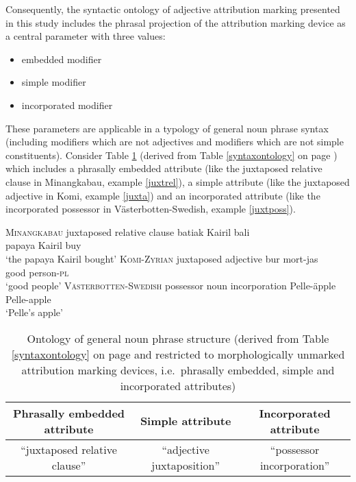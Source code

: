 Consequently, the syntactic ontology of adjective attribution marking presented in this study includes the phrasal projection of the attribution marking device as a central parameter with three values:
\begin{itemize}
\item embedded modifier
\item simple modifier
\item incorporated modifier
\end{itemize}
These parameters are applicable in a typology of general noun phrase syntax (including modifiers which are not adjectives and modifiers which are not simple constituents). Consider Table  \ref{ontologyderived} (derived from Table \ref{syntaxontology} on page \pageref{syntaxontology}) which includes a phrasally embedded attribute (like the juxtaposed relative clause in Minangkabau, example \ref{juxtrel}), a simple attribute (like the juxtaposed adjective in Komi, example \ref{juxta}) and an incorporated attribute (like the incorporated possessor in Västerbotten-Swedish, example \ref{juxtposs}).
\begin{exe}
\ex
\begin{xlist}
\ex \textsc{Minangkabau} juxtaposed relative clause \citep[3–4]{gil2005} \label{juxtrel}
\gll batiak Kairil bali\\
	papaya Kairil buy\\
\glt	‘the papaya Kairil bought’
\ex \textsc{Komi-Zyrian} juxtaposed adjective \citep[287]{lytkin1966a} \label{juxta}
\gll		bur	mort-jas\\
		good	person-\textsc{pl}\\
\glt		‘good people’
\ex \textsc{Västerbotten-Swedish} possessor noun incorporation \citep[3–4]{gil2005} \label{juxtposs}
\gll	Pelle-äpple\\
	Pelle-apple\\
\glt	‘Pelle's apple’
\end{xlist}
\end{exe}

\begin{table}
\begin{center}
\begin{footnotesize}
\begin{tabular}{c | c | c}
\hline
\hline
Phrasally embedded	attribute	&Simple attribute			&Incorporated attribute\\
\hline	
“juxtaposed relative clause”	&“adjective juxtaposition”		&“possessor incorporation”\\
\hline
\hline
\hline
\end{tabular}
\caption[Ontology of general noun phrase structure]{Ontology of general noun phrase structure (derived from Table \ref{syntaxontology} on page \pageref{syntaxontology} and restricted to morphologically unmarked attribution marking devices, i.e.~phrasally embedded, simple and incorporated attributes)}\label{ontologyderived}
\end{footnotesize}
\end{center}
\end{table}

